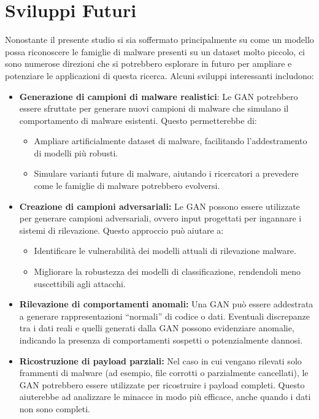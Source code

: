 \section{Sviluppi Futuri}
\indent Nonostante il presente studio si sia soffermato principalmente su come un modello possa riconoscere le famiglie di malware presenti su un dataset molto piccolo, ci sono numerose direzioni che si potrebbero esplorare in futuro per ampliare e potenziare le applicazioni di questa ricerca. Alcuni sviluppi interessanti includono:
\begin{itemize}
    \item \textbf{Generazione di campioni di malware realistici}: Le GAN potrebbero essere sfruttate per generare nuovi campioni di malware che simulano il comportamento di malware esistenti. Questo permetterebbe di:
    \begin{itemize}
        \item Ampliare artificialmente dataset di malware, facilitando l'addestramento di modelli più robusti.
        \item Simulare varianti future di malware, aiutando i ricercatori a prevedere come le famiglie di malware potrebbero evolversi.
    \end{itemize}

    \item \textbf{Creazione di campioni adversariali:} Le GAN possono essere utilizzate per generare campioni adversariali, ovvero input progettati per ingannare i sistemi di rilevazione. Questo approccio può aiutare a:
    \begin{itemize}
        \item Identificare le vulnerabilità dei modelli attuali di rilevazione malware.
        \item Migliorare la robustezza dei modelli di classificazione, rendendoli meno suscettibili agli attacchi.
    \end{itemize}

    \item \textbf{Rilevazione di comportamenti anomali:} Una GAN può essere addestrata a generare rappresentazioni ``normali'' di codice o dati. Eventuali discrepanze tra i dati reali e quelli generati dalla GAN possono evidenziare anomalie, indicando la presenza di comportamenti sospetti o potenzialmente dannosi.

    \item \textbf{Ricostruzione di payload parziali:} Nel caso in cui vengano rilevati solo frammenti di malware (ad esempio, file corrotti o parzialmente cancellati), le GAN potrebbero essere utilizzate per ricostruire i payload completi. Questo aiuterebbe ad analizzare le minacce in modo più efficace, anche quando i dati non sono completi.


\end{itemize}
